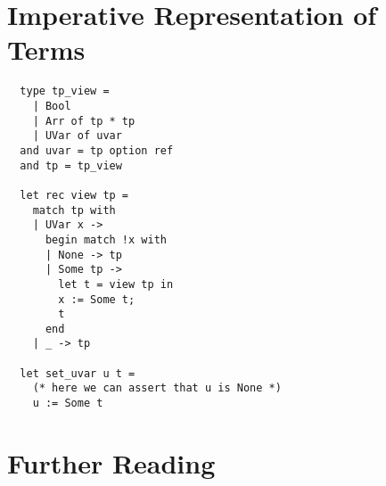 \section{Imperative Representation of Terms}

\begin{verbatim}
  type tp_view = 
    | Bool
    | Arr of tp * tp
    | UVar of uvar
  and uvar = tp option ref
  and tp = tp_view

  let rec view tp = 
    match tp with
    | UVar x ->
      begin match !x with
      | None -> tp
      | Some tp ->
        let t = view tp in
        x := Some t;
        t
      end
    | _ -> tp

  let set_uvar u t =
    (* here we can assert that u is None *)
    u := Some t
\end{verbatim}

\section{Further Reading}
